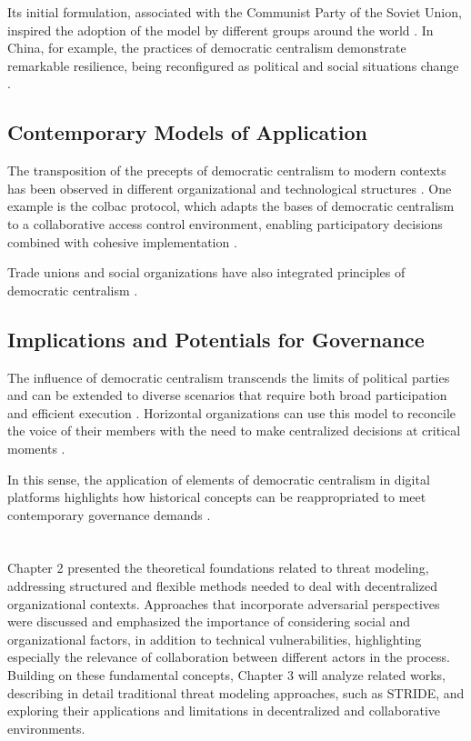 Its initial formulation, associated with the Communist Party of the Soviet
Union, inspired the adoption of the model by different groups around the world
\cite{StillaCenturyoftheChineseModel}. In China, for example, the practices of democratic
centralism demonstrate remarkable resilience, being reconfigured as political
and social situations change \cite{ACenturyofDemocraticCentralism}.

\subsection{Contemporary Models of Application}
\label{subsec:contemporary_models_application}

The transposition of the precepts of democratic centralism to modern contexts
has been observed in different organizational and technological structures
\cite{DoArtifactsHavePolitics, Colbac}. One example is the \gls{colbac}
protocol, which adapts the bases of democratic centralism to a collaborative
access control environment, enabling participatory decisions combined with
cohesive implementation \cite{Colbac}.

Trade unions and social organizations have also integrated principles of
democratic centralism \cite{CGTPStatutes}.

\subsection{Implications and Potentials for Governance}
\label{subsec:implications_potentials_governance}

The influence of democratic centralism transcends the limits of political
parties and can be extended to diverse scenarios that require both broad
participation and efficient execution \cite{ACenturyofDemocraticCentralism,
TheCostsofConnection}. Horizontal organizations can use this
model to reconcile the voice of their members with the need to make centralized
decisions at critical moments
\cite{StillaCenturyoftheChineseModel,ACenturyofDemocraticCentralism}.

In this sense, the application of elements of democratic centralism in digital
platforms highlights how historical concepts can be reappropriated to meet
contemporary governance demands \cite{Colbac}.

\section*{} 
Chapter 2 presented the theoretical foundations related to threat modeling,
addressing structured and flexible methods needed to deal with decentralized
organizational contexts. Approaches that incorporate adversarial perspectives
were discussed and emphasized the importance of considering social and
organizational factors, in addition to technical vulnerabilities, highlighting
especially the relevance of collaboration between different actors in the
process. Building on these fundamental concepts, Chapter 3 will analyze related
works, describing in detail traditional threat modeling approaches, such as
STRIDE, and exploring their applications and limitations in decentralized and
collaborative environments.
